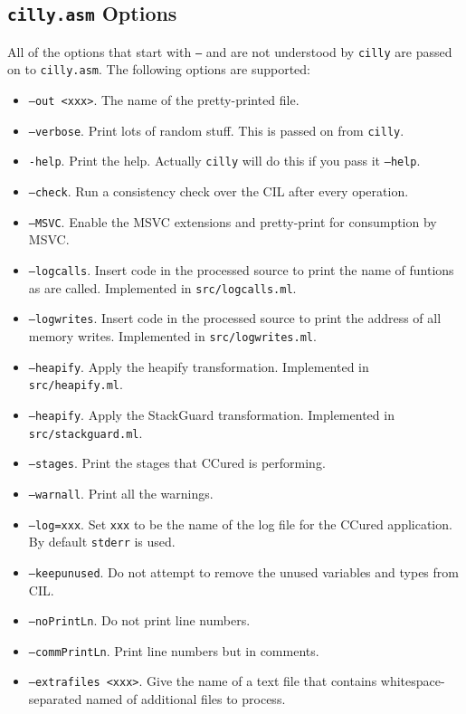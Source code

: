 \documentclass{article}
\def\t#1{{\tt #1}}
\begin{document}
 
  \subsection{\t{cilly.asm} Options}

 All of the options that start with \t{--} and are not understood by
\t{cilly} are passed on to \t{cilly.asm}. The following options are
supported:
\begin{itemize}
\item \t{--out <xxx>}. The name of the pretty-printed file.
\item \t{--verbose}. Print lots of random stuff. This is passed on from
\t{cilly}.
\item \t{-help}. Print the help. Actually \t{cilly} will do this if you
      pass it \t{--help}.  
\item \t{--check}. Run a consistency check over the CIL after every operation. 
\item \t{--MSVC}. Enable the MSVC extensions and pretty-print for consumption
by MSVC.
\item \t{--logcalls}. Insert code in the processed source to print the name of
funtions as are called. Implemented in \t{src/logcalls.ml}.
\item \t{--logwrites}. Insert code in the processed source to print the
address of all memory writes. Implemented in \t{src/logwrites.ml}.
\item \t{--heapify}. Apply the heapify transformation.
                     Implemented in \t{src/heapify.ml}.
\item \t{--heapify}. Apply the StackGuard transformation.
                     Implemented in \t{src/stackguard.ml}.
\item \t{--stages}. Print the stages that CCured is performing.
\item \t{--warnall}. Print all the warnings.
\item \t{--log=xxx}. Set \t{xxx} to be the name of the log file for the CCured
application. By default \t{stderr} is used.
\item \t{--keepunused}. Do not attempt to remove the unused variables and
       types from CIL. 
\item \t{--noPrintLn}. Do not print line numbers.
\item \t{--commPrintLn}. Print line numbers but in comments.
\item \t{--extrafiles <xxx>}. Give the name of a text file that contains
whitespace-separated named of additional files to process.
\end{itemize}
\end{document}
